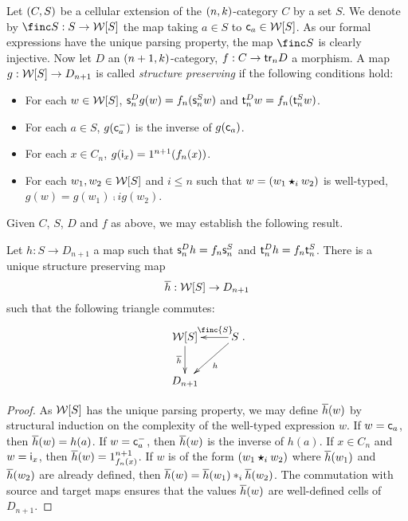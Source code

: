 \begin{paragr}
   Let $(C,S)$ be a cellular extension of the $(n,k)$-category
   $C$ by a set $S$. We denote by $\finc S:S\to \wtx S$ the map taking
  $a\in S$ to $\mathsf{c}_{a}\in\mathcal{W}[S]$. As our formal expressions have the
  unique parsing property, the map $\finc S$ is clearly injective. Now let
$D$ an $(n+1,k)$-category, $f:C\to \mathsf{tr}_{n}
   D$ a morphism. A map $g:\mathcal{W}[S]\to D_{n+1}$ is called {\em structure
     preserving} if the following conditions hold:
   \begin{itemize}
   \item For each $w\in\mathcal{W}[S]$, $\mathsf{s}_{n}^Dg(w)=f_n(\mathsf{s}_{n}^S w)$ and
     $\mathsf{t}_{n}^D w=f_n(\mathsf{t}_{n}^S w)$.
    \item For each $a\in S$, $g(\mathsf{c}^{-}_{a})$ is the inverse of $g(\mathsf{c}_{a})$.
    \item For each $x\in C_n$, $g(\mathsf{i}_{x})=1^{n+1}(f_n(x))$.
    \item For each $w_1,w_2\in\mathcal{W}[S]$ and $i\leq n$ such that
      $w=(w_1\bm{\star}_{i} w_2)$ is well-typed, $g(w)=g(w_1)\comp i g(w_2)$.  
    \end{itemize}
    Given $C$, $S$, $D$ and $f$ as above, we may establish the following result.
  \end{paragr}
  \begin{lemma}\label{lemma:strucpres}
    Let $h:S\to D_{n+1}$ a map such that $\mathsf{s}_{n}^Dh=f_n \mathsf{s}_{n}^S$ and $\mathsf{t}_{n}^Dh=f_{n} \mathsf{t}_{n}^S$. There is a unique
    structure preserving map
    \[\overline{h}:\mathcal{W}[S]\to D_{n+1}\]
    such that the following triangle commutes:
    \[
      \xymatrix{\wtx S\ar[d]_{\extend{h}} & S\ar[l]_(.4){\finc{S}}\ar[ld]^{h}\\
      D_{n+1} &}.
    \]
  \end{lemma}
  \begin{proof}
    As $\mathcal{W}[S]$ has the unique parsing property, we may define
    $\overline{h}(w)$ by structural induction on the complexity of the
    well-typed expression $w$. If $w=\mathsf{c}_{a}$, then $\overline{h}(w)=h(a)$. If $w=\mathsf{c}^{-}_{a}$, then $\overline{h}(w)$ is the inverse of
    $h(a)$. If $x\in C_n$ and $w=\mathsf{i}_{x}$, then $\overline{h}(w)=1^{n+1}_{f_n(x)}$. If $w$ is of the form $(w_1\bm{\star}_{i}
    w_2)$ where $\overline{h}(w_1)$ and $\overline{h}(w_2)$ are already
    defined, then $\overline{h}(w)=\overline{h}(w_1)\ast_{i} \overline{h}(w_2)$. The
    commutation with source and target maps ensures that the values
    $\overline{h} (w)$ are well-defined cells of $D_{n+1}$.
  \end{proof}
